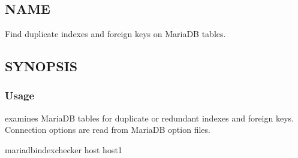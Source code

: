\documentclass[letterpaper,10pt,english]{sphinxmanual}
\begin{document}
\chapter{}
\label{\detokenize{mariadb-index-checker:mariadb-index-checker}}\label{\detokenize{mariadb-index-checker::doc}}

\section{NAME}
\label{\detokenize{mariadb-index-checker:name}}
\sphinxAtStartPar
{} \sphinxhyphen{} Find duplicate indexes and foreign keys on MariaDB tables.


\section{SYNOPSIS}
\label{\detokenize{mariadb-index-checker:synopsis}}

\subsection{Usage}
\label{\detokenize{mariadb-index-checker:usage}}
\begin{sphinxVerbatim}[commandchars=\\\{\}]
 \PYG{p}{[}\PYG{p}{]} \PYG{p}{[}\PYG{p}{]}
\end{sphinxVerbatim}

\sphinxAtStartPar
{} examines MariaDB tables for duplicate or redundant
indexes and foreign keys.  Connection options are read from MariaDB option files.

\begin{sphinxVerbatim}[commandchars=\\\{\}]
mariadb\PYGZhy{}index\PYGZhy{}checker \PYGZhy{}\PYGZhy{}host host1
\end{sphinxVerbatim}
\end{document}
